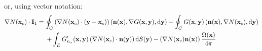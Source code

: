 %
or, using vector notation:
%
\begin{multline}
	{\nabla N}({\bf x}_c) \cdot {\bf I}_{1} = 
	\oint_C
	\left( \nabla N({\bf x}_c) \cdot ({\bf y} - {\bf x}_c) \right)
	\left( {\bf n}({\bf x}) , \nabla G({\bf x}, {\bf y}) , \mathrm{d} {\bf y} \right)
	-
	\oint_C
	G({\bf x}, {\bf y})
	\left(
	{\bf n}({\bf x}),
	\nabla N({\bf x}_c),
	\mathrm{d} {\bf y}
	\right)
	\\
	+
	\int_E
	G'_{n_x}({\bf x}, {\bf y})
	\left(\nabla N({\bf x}_c) \cdot {\bf n}({\bf y})\right)
	\mathrm{d} S({\bf y})
	-
	\left( \nabla N({\bf x}_c) {\bf n}({\bf x}) \right) \frac{\Omega({\bf x})}{4\pi}
\end{multline}
